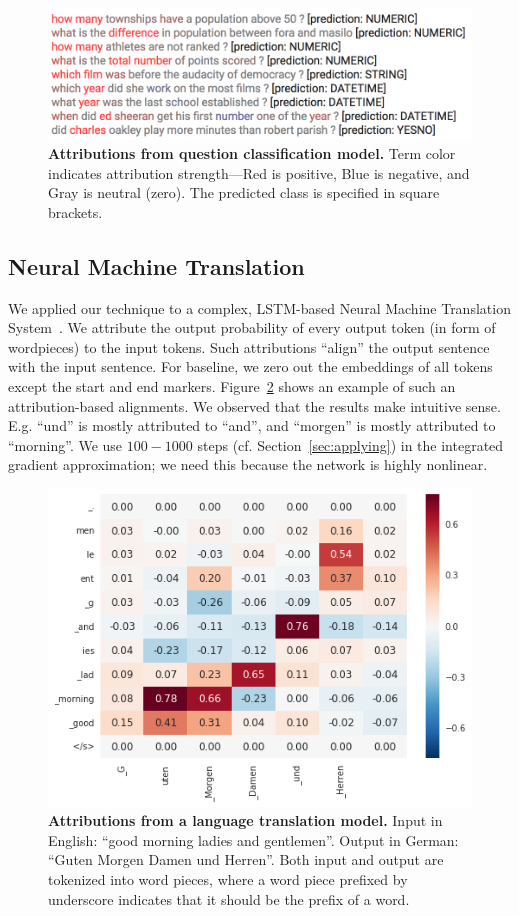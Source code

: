 \begin{figure}[!htb]
  \centering
  \includegraphics[width=\columnwidth]{./Figures/QuestionClassification/attributions.png}
  \caption{\textbf{Attributions from question classification model.} Term color indicates attribution
    strength---Red is positive, Blue is negative, and Gray is neutral (zero). The predicted
    class is specified in square brackets.}
  \label{fig:qc}
\end{figure}

\subsection{Neural Machine Translation}\label{sec:app-nmt}
We applied our technique to a complex, LSTM-based Neural Machine Translation System~\cite{Wu16}.
We attribute the output probability of every output token (in form of wordpieces)
to the input tokens. Such attributions ``align'' the output sentence with the input sentence.
For baseline, we zero out the embeddings of all tokens except the start and end markers.
Figure~\ref{fig:nmt} shows an example of such an attribution-based alignments.
We observed that the results make intuitive sense. E.g. ``und'' is mostly attributed to ``and'',
and ``morgen'' is mostly attributed to ``morning''.
We use $100-1000$ steps (cf. Section~\ref{sec:applying}) in the integrated gradient approximation; we need this because the network is highly nonlinear.

\begin{figure}[!htb]
  \centering
  \includegraphics[width=0.7\columnwidth]{./Figures/NMT/nmt.png}
  \caption{\textbf{Attributions from a language translation model.} Input in English: ``good morning ladies and gentlemen''. Output in German: ``Guten Morgen Damen und Herren''. Both input and output are tokenized into word pieces, where a word piece prefixed by underscore indicates that it should be the prefix of a word.}
  \label{fig:nmt}
\end{figure}

